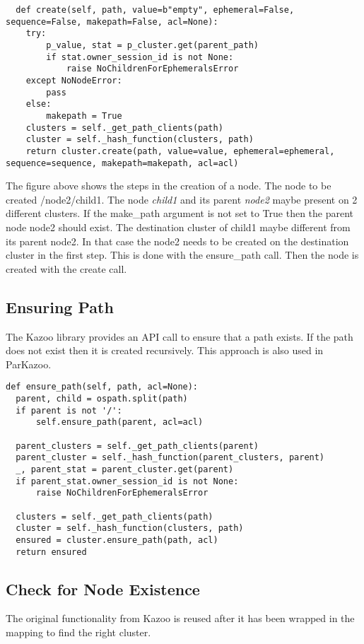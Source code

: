 \begin{lstlisting}
  def create(self, path, value=b"empty", ephemeral=False, sequence=False, makepath=False, acl=None):
    try:
        p_value, stat = p_cluster.get(parent_path)
        if stat.owner_session_id is not None:
            raise NoChildrenForEphemeralsError
    except NoNodeError:
        pass
    else:
        makepath = True
    clusters = self._get_path_clients(path)
    cluster = self._hash_function(clusters, path)
    return cluster.create(path, value=value, ephemeral=ephemeral, sequence=sequence, makepath=makepath, acl=acl)
\end{lstlisting}



The figure above shows the steps in the creation of a node. The node to be created /node2/child1. The node \textit{child1} and its parent \textit{node2} maybe present on 2 different clusters. If the make\_path argument is not set to True then the parent node node2 should exist. The destination cluster of child1 maybe different from its parent node2. In that case the node2 needs to be created on the destination cluster in the first step. This is done with the ensure\_path call. Then the node is created with the create call.


\subsection{Ensuring Path}
The Kazoo library provides an API call to ensure that a path exists. If the path does not exist then it is created recursively. This approach is also used in ParKazoo.

\begin{lstlisting}
def ensure_path(self, path, acl=None):
  parent, child = ospath.split(path)
  if parent is not '/':
      self.ensure_path(parent, acl=acl)

  parent_clusters = self._get_path_clients(parent)
  parent_cluster = self._hash_function(parent_clusters, parent)
  _, parent_stat = parent_cluster.get(parent)
  if parent_stat.owner_session_id is not None:
      raise NoChildrenForEphemeralsError

  clusters = self._get_path_clients(path)
  cluster = self._hash_function(clusters, path)
  ensured = cluster.ensure_path(path, acl)
  return ensured
\end{lstlisting}

\subsection{Check for Node Existence}
The original functionality from Kazoo is reused after it has been wrapped in the mapping to find the right cluster.

